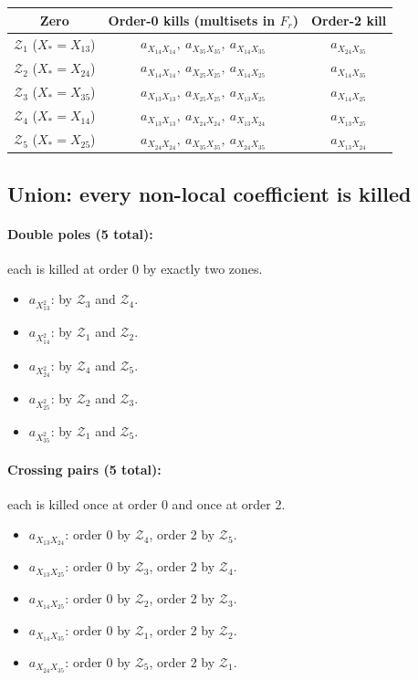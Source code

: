 \documentclass[11pt]{article}
\newcommand{\X}[2]{X_{#1#2}}
\newcommand{\Z}{\mathcal{Z}}
\theoremstyle{definition}
\begin{document}
\begin{center}
\renewcommand{\arraystretch}{1.2}
\begin{tabular}{c|c|c}
\toprule
Zero & Order-0 kills (multisets in $F_r$) & Order-2 kill \\
\midrule
$\Z_1$ ($X_*=\X{1}{3}$) & $a_{\X{1}{4}\X{1}{4}},\ a_{\X{3}{5}\X{3}{5}},\ a_{\X{1}{4}\X{3}{5}}$ & $a_{\X{2}{4}\X{3}{5}}$\\
$\Z_2$ ($X_*=\X{2}{4}$) & $a_{\X{1}{4}\X{1}{4}},\ a_{\X{2}{5}\X{2}{5}},\ a_{\X{1}{4}\X{2}{5}}$ & $a_{\X{1}{4}\X{3}{5}}$\\
$\Z_3$ ($X_*=\X{3}{5}$) & $a_{\X{1}{3}\X{1}{3}},\ a_{\X{2}{5}\X{2}{5}},\ a_{\X{1}{3}\X{2}{5}}$ & $a_{\X{1}{4}\X{2}{5}}$\\
$\Z_4$ ($X_*=\X{1}{4}$) & $a_{\X{1}{3}\X{1}{3}},\ a_{\X{2}{4}\X{2}{4}},\ a_{\X{1}{3}\X{2}{4}}$ & $a_{\X{1}{3}\X{2}{5}}$\\
$\Z_5$ ($X_*=\X{2}{5}$) & $a_{\X{2}{4}\X{2}{4}},\ a_{\X{3}{5}\X{3}{5}},\ a_{\X{2}{4}\X{3}{5}}$ & $a_{\X{1}{3}\X{2}{4}}$\\
\bottomrule
\end{tabular}
\end{center}

\subsection{Union: every non-local coefficient is killed}

\paragraph{Double poles (5 total):} each is killed at order 0 by exactly two zones.
\begin{itemize}[nosep,leftmargin=2em]
\item $a_{\X{1}{3}^2}$: by $\Z_3$ and $\Z_4$.
\item $a_{\X{1}{4}^2}$: by $\Z_1$ and $\Z_2$.
\item $a_{\X{2}{4}^2}$: by $\Z_4$ and $\Z_5$.
\item $a_{\X{2}{5}^2}$: by $\Z_2$ and $\Z_3$.
\item $a_{\X{3}{5}^2}$: by $\Z_1$ and $\Z_5$.
\end{itemize}

\paragraph{Crossing pairs (5 total):} each is killed once at order 0 and once at order 2.
\begin{itemize}[nosep,leftmargin=2em]
\item $a_{\X{1}{3}\X{2}{4}}$: order 0 by $\Z_4$, order 2 by $\Z_5$.
\item $a_{\X{1}{3}\X{2}{5}}$: order 0 by $\Z_3$, order 2 by $\Z_4$.
\item $a_{\X{1}{4}\X{2}{5}}$: order 0 by $\Z_2$, order 2 by $\Z_3$.
\item $a_{\X{1}{4}\X{3}{5}}$: order 0 by $\Z_1$, order 2 by $\Z_2$.
\item $a_{\X{2}{4}\X{3}{5}}$: order 0 by $\Z_5$, order 2 by $\Z_1$.
\end{itemize}
\end{document}
